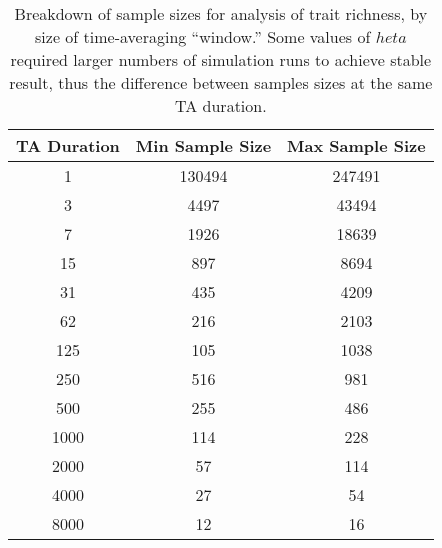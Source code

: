 \begin{table}[ht]
\begin{ruledtabular}
\begin{tabular}{|c|c|c|}
  \hline
TA Duration & Min Sample Size & Max Sample Size \\ 
  \hline
  1 & 130494 & 247491 \\ 
    3 & 4497 & 43494 \\ 
    7 & 1926 & 18639 \\ 
   15 & 897 & 8694 \\ 
   31 & 435 & 4209 \\ 
   62 & 216 & 2103 \\ 
  125 & 105 & 1038 \\ 
  250 & 516 & 981 \\ 
  500 & 255 & 486 \\ 
  1000 & 114 & 228 \\ 
  2000 &  57 & 114 \\ 
  4000 &  27 &  54 \\ 
  8000 &  12 &  16 \\ 
   \hline
\end{tabular}
\caption{Breakdown of sample sizes for analysis of trait richness, by size of time-averaging ``window.''  Some values of $	heta$ required larger numbers of simulation runs to achieve stable result, thus the difference between samples sizes at the same TA duration.}
\label{tab:sample-size-kn}
\end{ruledtabular}
\end{table}
